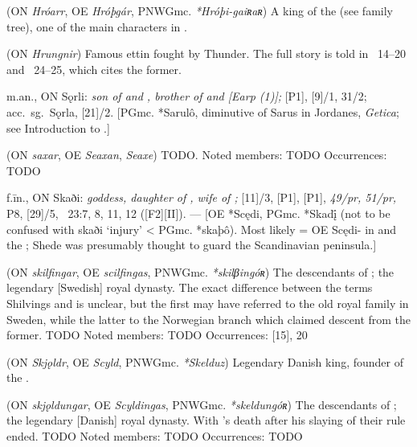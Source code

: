 \begin{itemize}
 (ON \emph{Hróarr}, OE \emph{Hróþgár}, PNWGmc. \emph{*Hróþi-gaiʀaʀ})
  A king of the  (see family tree), one of the main characters in \Beowulf.

 (ON \emph{Hrungnir})
  Famous ettin fought by Thunder.  The full story is told in \Haustlong\ 14--20 and \Skaldskaparmal\ 24--25, which cites the former.

 m.an., ON Sǫrli:
  \emph{son of  and , brother of  and [Earp (1)];} [P1], [9]/1, 31/2;
  acc.~sg.~Sǫrla, [21]/2.
  [PGmc. *Sarulô, diminutive of Sarus in Jordanes, \emph{Getica}; see Introduction to .]

 (ON \emph{saxar}, OE \emph{Seaxan}, \emph{Seaxe})
  TODO.
  Noted members: TODO
  Occurrences: TODO

 f.īn., ON Skaði:
  \emph{goddess, daughter of , wife of ;} [11]/3, [P1], [P1], \emph{49/pr, 51/pr,} P8, [29]/5, \Gylfaginning~23:7, 8, 11, 12 ([F2][II]). ---
  [OE *Scędi, PGmc. *Skadį̄ (not to be confused with skaði ‘injury’ < PGmc. *skaþô).  Most likely = OE Scędi- in  and the ; Shede was presumably thought to guard the Scandinavian peninsula.]

 (ON \emph{skilfingar}, OE \emph{scilfingas}, PNWGmc. \emph{*skilβingóʀ})
  The descendants of ; the legendary [Swedish] royal dynasty. The exact difference between the terms Shilvings and  is unclear, but the first may have referred to the old royal family in Sweden, while the latter to the Norwegian branch which claimed descent from the former. TODO
  Noted members: TODO
  Occurrences: [15], 20

 (ON \emph{Skjǫldr}, OE \emph{Scyld}, PNWGmc. \emph{*Skelduz})
  Legendary Danish king, founder of the .

 (ON \emph{skjǫldungar}, OE \emph{Scyldingas}, PNWGmc. \emph{*skeldungóʀ})
  The descendants of ; the legendary [Danish] royal dynasty. With ’s death after his slaying of  their rule ended. TODO
  Noted members: TODO
  Occurrences: TODO


\end{itemize}
